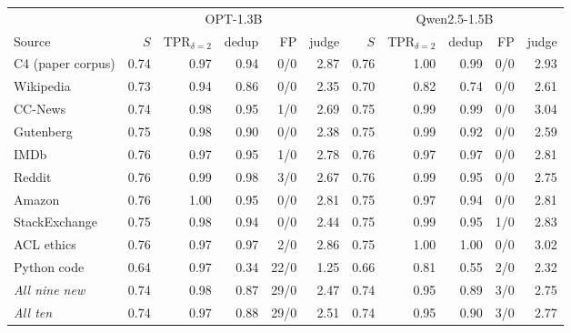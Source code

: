 \begin{tabular}{@{}l rrrrr rrrrr@{}}
\toprule
 & \multicolumn{5}{c}{OPT-1.3B} & \multicolumn{5}{c}{Qwen2.5-1.5B} \\
\cmidrule(lr){2-6}\cmidrule(lr){7-11}
Source & $S$ & TPR$_{\delta=2}$ & dedup & FP & judge & $S$ & TPR$_{\delta=2}$ & dedup & FP & judge \\
\midrule
C4 (paper corpus) & 0.74 & 0.97 & 0.94 & 0/0 & 2.87 & 0.76 & 1.00 & 0.99 & 0/0 & 2.93 \\
Wikipedia & 0.73 & 0.94 & 0.86 & 0/0 & 2.35 & 0.70 & 0.82 & 0.74 & 0/0 & 2.61 \\
CC-News & 0.74 & 0.98 & 0.95 & 1/0 & 2.69 & 0.75 & 0.99 & 0.99 & 0/0 & 3.04 \\
Gutenberg & 0.75 & 0.98 & 0.90 & 0/0 & 2.38 & 0.75 & 0.99 & 0.92 & 0/0 & 2.59 \\
IMDb & 0.76 & 0.97 & 0.95 & 1/0 & 2.78 & 0.76 & 0.97 & 0.97 & 0/0 & 2.81 \\
Reddit & 0.76 & 0.99 & 0.98 & 3/0 & 2.67 & 0.76 & 0.99 & 0.95 & 0/0 & 2.75 \\
Amazon & 0.76 & 1.00 & 0.95 & 0/0 & 2.81 & 0.75 & 0.97 & 0.94 & 0/0 & 2.81 \\
StackExchange & 0.75 & 0.98 & 0.94 & 0/0 & 2.44 & 0.75 & 0.99 & 0.95 & 1/0 & 2.83 \\
ACL ethics & 0.76 & 0.97 & 0.97 & 2/0 & 2.86 & 0.75 & 1.00 & 1.00 & 0/0 & 3.02 \\
Python code & 0.64 & 0.97 & 0.34 & 22/0 & 1.25 & 0.66 & 0.81 & 0.55 & 2/0 & 2.32 \\
\midrule
\textit{All nine new} & 0.74 & 0.98 & 0.87 & 29/0 & 2.47 & 0.74 & 0.95 & 0.89 & 3/0 & 2.75 \\
\textit{All ten} & 0.74 & 0.97 & 0.88 & 29/0 & 2.51 & 0.74 & 0.95 & 0.90 & 3/0 & 2.77 \\
\bottomrule
\end{tabular}